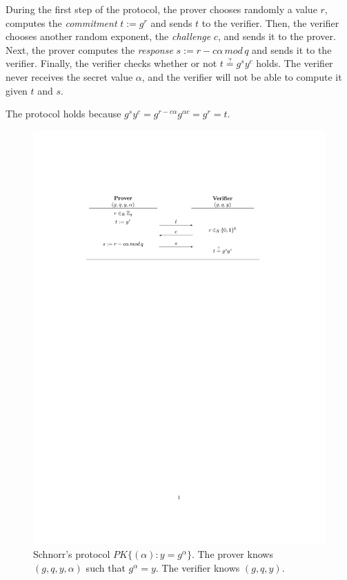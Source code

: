 During the first step of the protocol, the prover chooses randomly a value $r$, computes the \textit{commitment} $t := g^{r}$ and sends $t$ to the verifier. 
Then, the verifier chooses another random exponent, the \textit{challenge} $c$, and sends it to the prover. 
Next, the prover computes the \textit{response} $s:=r-c\alpha\, mod\, q$ and sends it to the verifier.
Finally, the verifier checks whether or not $ t \overset{?}{=} g^{s} y^c $ holds. The verifier never receives the secret value $\alpha$, and the verifier will not be able to compute it given $t$ and $s$.

The protocol holds because $ g^{s} y^c  =  g^{r - c\alpha} g^{\alpha c} = g^{r} = t $.

\begin{figure}[bth]
	\includegraphics[width=\linewidth]{gfx/schnorr}
		\caption{Schnorr's protocol $PK\{ (\alpha) : y = g^\alpha \}$. The prover knows $(g,q,y,\alpha)$ such that $g^\alpha=y$. The verifier knows $(g,q,y)$.}
	\label{fig:schnorr}
\end{figure}


